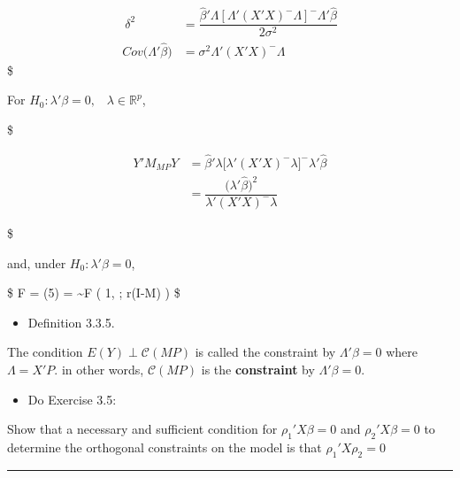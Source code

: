 \documentclass[
]{book}
\providecommand{\tightlist}{%
  \setlength{\itemsep}{0pt}\setlength{\parskip}{0pt}}
\begin{document}
{{{\begin{align}
\\\
\\\



\delta^2  &= \dfrac{\hat \beta ' \Lambda [\Lambda ' (X'X)^- \Lambda]^- \Lambda' \hat \beta}{2 \sigma^2} \\

Cov\Big(\Lambda ' \hat \beta \Big)  &= \sigma^2 \Lambda ' (X' X)^{-} \Lambda 



\end{align}
\$

For \(H_0: \lambda ' \beta =0, \; \; \; \lambda \in \mathbb{R}^p\),

\$

\begin{align}


Y'M_{MP}Y &= \hat \beta ' \lambda \big [\lambda ' (X'X)^- \lambda \big]^- \lambda' \hat \beta

\\

&=\dfrac{\big( \lambda' \hat \beta \big)^2}{\lambda'(X'X)^-\lambda}

\end{align}

\$

and, under \(H_0: \lambda ' \beta =0\),

\$
F = (5) =  \sim F \Big ( 1, ; r(I-M) \Big)
\$

\begin{itemize}
\tightlist
\item
  Definition 3.3.5.
\end{itemize}

The condition \(E(Y) \perp \mathcal{C}(MP)\) is called the constraint by \(\Lambda ' \beta = 0\) where \(\Lambda = X' P\). in other words, \(\mathcal{C}(MP)\) is the \textbf{constraint} by \(\Lambda ' \beta = 0\).

\begin{itemize}
\tightlist
\item
  Do Exercise 3.5:
\end{itemize}

Show that a necessary and sufficient condition for \(\rho_1 ' X \beta = 0\) and \(\rho_2 ' X \beta = 0\) to determine the orthogonal constraints on the model is that \(\rho_1 ' X \rho_2 = 0\)

\begin{center}\rule{0.5\linewidth}{0.5pt}\end{center}

}}}
\end{document}
